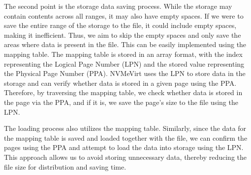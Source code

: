The second point is the storage data saving process.
While the storage may contain contents across all ranges, it may also have empty spaces.
If we were to save the entire range of the storage to the file, it could include empty spaces, making it inefficient.
Thus, we aim to skip the empty spaces and only save the areas where data is present in the file.
This can be easily implemented using the mapping table.
The mapping table is stored in an array format, with the index representing the Logical Page Number (LPN) and the stored value representing the Physical Page Number (PPA).
NVMeVirt uses the LPN to store data in the storage and can verify whether data is stored in a given page using the PPA.
Therefore, by traversing the mapping table, we check whether data is stored in the page via the PPA, and if it is, we save the page's size to the file using the LPN.


The loading process also utilizes the mapping table.
Similarly, since the data for the mapping table is saved and loaded together with the file, we can confirm the pages using the PPA and attempt to load the data into storage using the LPN.
This approach allows us to avoid storing unnecessary data, thereby reducing the file size for distribution and saving time.

